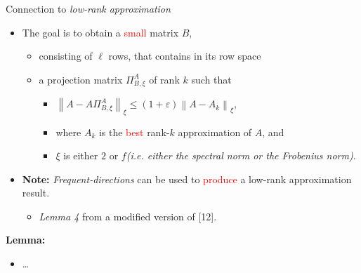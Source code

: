 \documentclass[first=dgreen,second=purple,logo=redque]{aaltoslides}
\newcommand{\vectornorm}[1]{\left\|#1\right\|}
\begin{document}
\begin{frame}[allowframebreaks=1]{Connection to \textit{low-rank approximation}}

\begin{itemize}
   \item The goal is to obtain a \textcolor{red}{small} matrix $B$,
   \begin{itemize}
     \item consisting of $\ell$ rows, that contains in its row space
   	 \item a projection matrix $\Pi_{B,\xi}^{A}$ of rank $k$ such that 
   	 \begin{itemize}
   	   \item $\vectornorm{A - A\Pi_{B,\xi}^{A}}_{\xi} \leq (1+\varepsilon)
   	   \vectornorm{A - A_{k}}_{\xi}$, 

   	     	\item where $A_{k}$ is the \textcolor{red}{best}
   	   rank-$k$ approximation of $A$, and
   	   		\item $\xi$ is either $2$ or $f$\emph{(i.e. either the spectral norm or
   	   the Frobenius norm)}.
   	 \end{itemize}
   \end{itemize}
   \item \textbf{Note:} \textit{Frequent-directions} can be used to
   \textcolor{red}{produce} a low-rank approximation result.
   \begin{itemize} \item \textit{Lemma 4} from a modified version
   of [12].\end{itemize}
\end{itemize}

\framebreak

\textbf{Lemma: }
\begin{itemize}
    \item \ldots
\end{itemize}

\end{frame}

\end{document}
